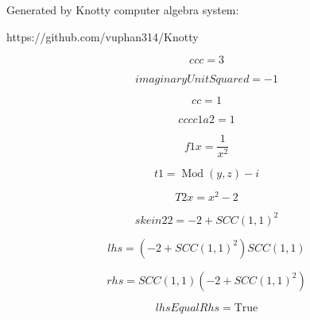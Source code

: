 \documentclass[letterpaper, 10pt]{extarticle}
\begin{document}
Generated by Knotty computer algebra system:

https://github.com/vuphan314/Knotty

\hrulefill

\bigskip

\begin{dmath*}
ccc =
    3
\end{dmath*}


\begin{dmath*}
imaginaryUnitSquared =
    -1
\end{dmath*}


\begin{dmath*}
cc =
    1
\end{dmath*}


\begin{dmath*}
cccc1a2 =
    1
\end{dmath*}


\begin{dmath*}
f1x =
    \frac{1}{x^{2}}
\end{dmath*}


\begin{dmath*}
t1 =
    \operatorname{Mod}{\left (y,z \right )} - i
\end{dmath*}


\begin{dmath*}
T2x =
    x^{2} - 2
\end{dmath*}


\begin{dmath*}
skein22 =
    -2 + SCC(1, 1)^{2}
\end{dmath*}


\begin{dmath*}
lhs =
    \left(-2 + SCC(1, 1)^{2}\right) SCC(1, 1)
\end{dmath*}


\begin{dmath*}
rhs =
    SCC(1, 1) \left(-2 + SCC(1, 1)^{2}\right)
\end{dmath*}


\begin{dmath*}
lhsEqualRhs =
    \mathrm{True}
\end{dmath*}
\end{document}
